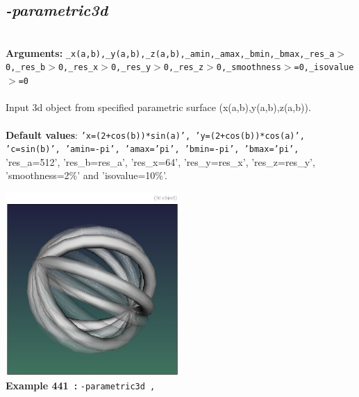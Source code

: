 \documentclass[a4paper,11pt,twoside]{book}
\begin{document}
\subsection{\emph{-parametric3d} }\vspace*{-0.5em}
~\\\textbf{Arguments: } 
{\small \texttt{\_x(a,b),\_y(a,b),\_z(a,b),\_amin,\_amax,\_bmin,\_bmax,\_res\_a$>$0,\_res\_b$>$0,\_res\_x$>$0,\_res\_y$>$0,\_res\_z$>$0,\_smoothness$>$=0,\_isovalue$>$=0}}\\~\\
Input 3d object from specified parametric surface (x(a,b),y(a,b),z(a,b)).
~\\~\\\textbf{Default values}: {\small \texttt{'x=(2+cos(b))*sin(a)', 'y=(2+cos(b))*cos(a)', 'c=sin(b)', 'amin=-pi', 'amax='pi', 'bmin=-pi', 'bmax='pi',}}
~\\'res\_a=512', 'res\_b=res\_a', 'res\_x=64', 'res\_y=res\_x', 'res\_z=res\_y', 'smoothness=2\%' and 'isovalue=10\%'.
\begin{center}\includegraphics[keepaspectratio=true,height=7cm,width=\textwidth]{img/gmic_def441.jpg}\\
{\footnotesize \textbf{Example 441~:} \texttt{-parametric3d ,}}
\end{center}
\end{document}
